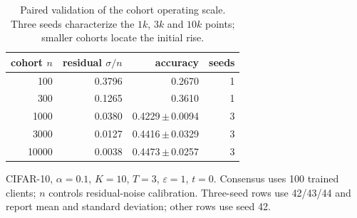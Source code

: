 \begin{table}[ht]
  \caption{Paired validation of the cohort operating scale. Three seeds characterize the $1k$, $3k$ and $10k$ points; smaller cohorts locate the initial rise.}
  \label{tab:cohort-validation}
  \small
  \begin{tabular}{@{}rrrr@{}}
    \toprule
    cohort $n$ & residual $\sigma/n$ & accuracy & seeds \\
    \midrule
    100 & 0.3796 & 0.2670 & 1 \\
    300 & 0.1265 & 0.3610 & 1 \\
    1000 & 0.0380 & 0.4229\,$\pm$\,0.0094 & 3 \\
    3000 & 0.0127 & 0.4416\,$\pm$\,0.0329 & 3 \\
    10000 & 0.0038 & 0.4473\,$\pm$\,0.0257 & 3 \\
    \bottomrule
  \end{tabular}
  \vspace{2pt}
  \parbox{\linewidth}{\footnotesize CIFAR-10, $\alpha=0.1$, $K=10$, $T=3$, $\varepsilon=1$, $t=0$. Consensus uses 100 trained clients; $n$ controls residual-noise calibration. Three-seed rows use 42/43/44 and report mean and standard deviation; other rows use seed 42.}
\end{table}
